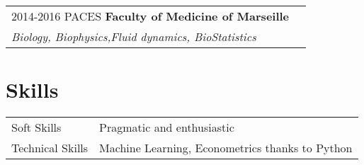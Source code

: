 \documentclass[a4paper,12pt]{article}
\begin{document}
\begin{tabularx}{\linewidth}{@{}l X@{}}	
2014-2016 PACES \textbf{Faculty of Medicine of Marseille} \hfill \normalsize \\
\textit{Biology, Biophysics,Fluid dynamics, BioStatistics}
\end{tabularx}
\section{Skills}
\begin{tabularx}{\linewidth}{@{}l X@{}}
Soft Skills &  \normalsize{Pragmatic and enthusiastic}\\
Technical Skills  &  \normalsize{ Machine Learning, Econometrics thanks to Python}\\  
\end{tabularx}

\vfill
{}
\end{document}
